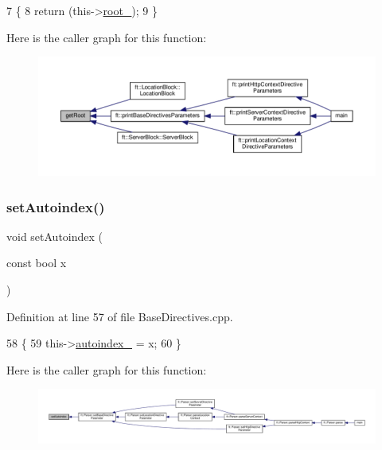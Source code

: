 \begin{DoxyCode}
7     \{
8         \textcolor{keywordflow}{return} (this->\hyperlink{classft_1_1_base_directives_abb1eaf0bba10b90172d6152e69457dc7}{root\_});
9     \}
\end{DoxyCode}
Here is the caller graph for this function\+:
\nopagebreak
\begin{figure}[H]
\begin{center}
\leavevmode
\includegraphics[width=350pt]{classft_1_1_base_directives_aa5dbcb08bda0a0e7e502d2df7cf64287_icgraph}
\end{center}
\end{figure}
\mbox{\label{classft_1_1_base_directives_ae7293c7bbf34e9bdc60c540dccd53342}} 
\subsubsection{\texorpdfstring{set\+Autoindex()}{setAutoindex()}}
{\footnotesize\ttfamily void set\+Autoindex (\begin{DoxyParamCaption}\item[{const bool}]{x }\end{DoxyParamCaption})}



Definition at line 57 of file Base\+Directives.\+cpp.


\begin{DoxyCode}
58     \{
59         this->\hyperlink{classft_1_1_base_directives_a4ebffbe32f50a462afa139c6f03c1a4f}{autoindex\_} = x;
60     \}
\end{DoxyCode}
Here is the caller graph for this function\+:
\nopagebreak
\begin{figure}[H]
\begin{center}
\leavevmode
\includegraphics[width=350pt]{classft_1_1_base_directives_ae7293c7bbf34e9bdc60c540dccd53342_icgraph}
\end{center}
\end{figure}
\mbox{\label{classft_1_1_base_directives_a39bf4922f3236043c76beaffaa557a3b}} 
